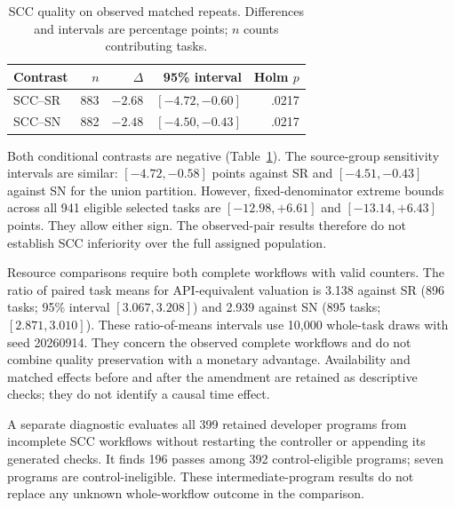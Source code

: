 \begin{table}[t]
\caption{SCC quality on observed matched repeats. Differences and intervals are percentage points; $n$ counts contributing tasks.}
\label{tab:scc-quality}
\centering\small
\begin{tabular}{@{}lrrrr@{}}
\toprule
Contrast & $n$ & $\Delta$ & 95\% interval & Holm $p$\\
\midrule
SCC--SR & 883 & $-2.68$ & $[-4.72,-0.60]$ & .0217\\
SCC--SN & 882 & $-2.48$ & $[-4.50,-0.43]$ & .0217\\
\bottomrule
\end{tabular}
\end{table}

Both conditional contrasts are negative (Table~\ref{tab:scc-quality}). The source-group sensitivity intervals are similar: $[-4.72,-0.58]$ points against SR and $[-4.51,-0.43]$ against SN for the union partition. However, fixed-denominator extreme bounds across all 941 eligible selected tasks are $[-12.98,+6.61]$ and $[-13.14,+6.43]$ points. They allow either sign. The observed-pair results therefore do not establish SCC inferiority over the full assigned population.

Resource comparisons require both complete workflows with valid counters. The ratio of paired task means for API-equivalent valuation is 3.138 against SR (896 tasks; 95\% interval $[3.067,3.208]$) and 2.939 against SN (895 tasks; $[2.871,3.010]$). These ratio-of-means intervals use 10,000 whole-task draws with seed 20260914. They concern the observed complete workflows and do not combine quality preservation with a monetary advantage. Availability and matched effects before and after the amendment are retained as descriptive checks; they do not identify a causal time effect.

A separate diagnostic evaluates all 399 retained developer programs from incomplete SCC workflows without restarting the controller or appending its generated checks. It finds 196 passes among 392 control-eligible programs; seven programs are control-ineligible. These intermediate-program results do not replace any unknown whole-workflow outcome in the comparison.
